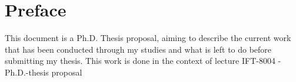 \section{Preface}
\label{sec:preface}

This document is a Ph.D. Thesis proposal, aiming to describe the current work that has been conducted through my studies and what is left to do before submitting my thesis.
This work is done in the context of lecture IFT-8004 - Ph.D.-thesis proposal